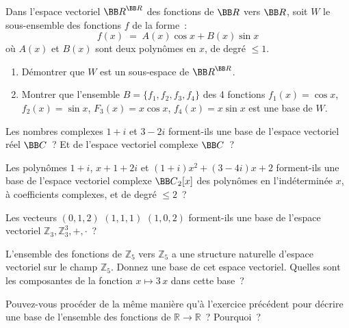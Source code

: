 \documentclass[12pt,french,oneside,a4paper]{memoir} %
\begin{document}
\begin{exo}
Dans l'espace vectoriel ${\BB R}^{\BB R}$ des fonctions de ${\BB R}$ vers ${\BB R}$, soit $W$ le sous-ensemble des fonctions $f$ de la forme~:
\begin{equation*}
f(x)\;=\;A(x) \cos x + B(x) \sin x
\end{equation*}
où $A(x)$ et $B(x)$ sont deux polynômes en $x$, de degré $\leq 1$. 
\begin{enumerate}
\item Démontrer que $W$ est un sous-espace de ${\BB R}^{\BB R}$.
\item Montrer que l'ensemble $B=\{ f_1, f_2, f_3, f_4 \}$ des 4 fonctions 
$f_1(x)=\cos x$, $f_2(x)= \sin x$, $F_3(x)=x \cos x$, $f_4(x) = x \sin x$
est une base de $W$.
\end{enumerate}
\end{exo}
\begin{exo}
Les nombres complexes $1+i$ et $3-2i$ forment-ils une base de 
l'espace vectoriel réel ${\BB C}$~? Et de l'espace vectoriel complexe 
${\BB C}$~?
\end{exo}
\begin{exo}
Les polynômes $1+i$, $x+1+2i$ et $(1+i)x^2+(3-4i)x+2$ forment-ils 
une base de l'espace vectoriel complexe ${\BB C}_2[x]$ des polynômes en l'indéterminée 
$x$, à coefficients complexes, et de degré $\leq 2$~?
\end{exo}
\begin{exo}
Les vecteurs $(0,1,2)$ $(1,1,1)$ $(1,0,2)$ forment-ils une
base de l'espace vectoriel $\mathbb Z_3, \mathbb Z_3^3,+,\cdot$~?
\end{exo}
\begin{exo}
 L'ensemble des fonctions de $\mathbb Z_5$ vers $\mathbb Z_5$ a
une structure naturelle d'espace vectoriel sur le champ $\mathbb
Z_5$. Donnez une base de cet espace vectoriel. Quelles
sont les composantes de la fonction $x \mapsto 3\,x$ dans cette base~?
\end{exo}
\begin{exo}
Pouvez-vous procéder de la même manière qu'à l'exercice précédent pour décrire une base de l'ensemble des fonctions de $\mathbb R \to \mathbb R$~? Pourquoi~?
\end{exo}
\end{document}
